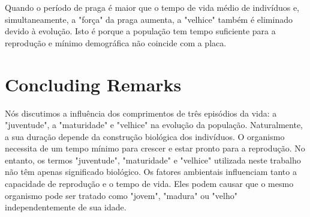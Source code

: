 \documentclass{article}
\begin{document}
Quando o período de praga é maior que o tempo de vida médio de indivíduos e, simultaneamente, a "força" da praga aumenta, a "velhice" também é eliminado devido à evolução. Isto é porque a população tem tempo suficiente para a reprodução e mínimo demográfica não coincide com a placa.

\newpage


\section{Concluding Remarks}


Nós discutimos a influência dos comprimentos de três episódios da vida: a "juventude", a "maturidade" e "velhice" na evolução da população. Naturalmente, a sua duração depende da construção biológica dos indivíduos. O organismo necessita de um tempo mínimo para crescer e estar pronto para a reprodução. No entanto, os termos "juventude", "maturidade" e "velhice" utilizada neste trabalho não têm apenas significado biológico. Os fatores ambientais influenciam tanto a capacidade de reprodução e o tempo de vida. Eles podem causar que o mesmo organismo pode ser tratado como "jovem", "madura" ou "velho" independentemente de sua idade.

\end{document}
